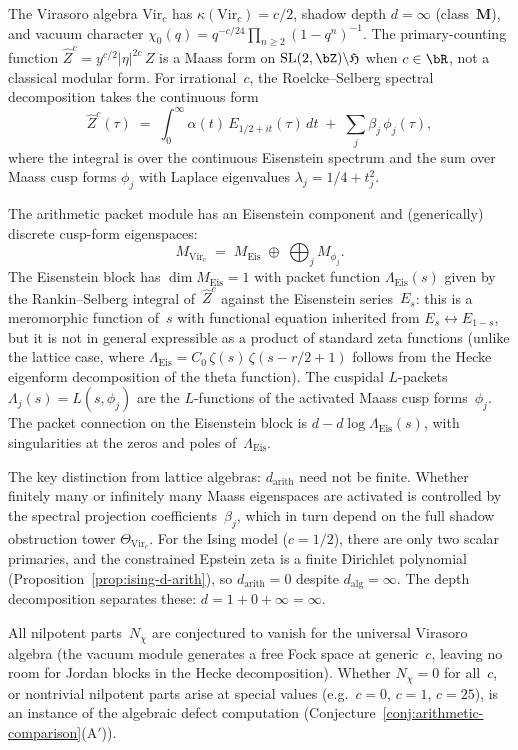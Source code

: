 \begin{example}%
\label{ex:packet-virasoro}%
%
%
The Virasoro algebra $\mathrm{Vir}_c$ has
$\kappa(\mathrm{Vir}_c) = c/2$, shadow depth $d = \infty$
(class~$\mathbf{M}$), and vacuum character
$\chi_0(q) = q^{-c/24}\prod_{n \geq 2}(1-q^n)^{-1}$.
The primary-counting function
$\widehat{Z}^c = y^{c/2}\lvert\eta\rvert^{2c}\,Z$
is a Maass form on $\mathrm{SL}(2,\bZ)\backslash\mathfrak{H}$
when $c \in \bR$, not a classical modular form.
For irrational~$c$, the Roelcke--Selberg spectral
decomposition takes the continuous form
\[
 \widehat{Z}^c(\tau)
 \;=\;
 \int_0^\infty \alpha(t)\,E_{1/2+it}(\tau)\,dt
 \;+\;
 \sum_j \beta_j\,\phi_j(\tau),
\]
where the integral is over the continuous Eisenstein spectrum
and the sum over Maass cusp forms $\phi_j$ with Laplace
eigenvalues $\lambda_j = 1/4 + t_j^2$.

The arithmetic packet module has an Eisenstein
component and (generically) discrete cusp-form eigenspaces:
\[
 M_{\mathrm{Vir}_c}
 \;=\;
 M_{\mathrm{Eis}} \;\oplus\;
 \bigoplus_j M_{\phi_j}.
\]
The Eisenstein block has $\dim M_{\mathrm{Eis}} = 1$ with
packet function $\Lambda_{\mathrm{Eis}}(s)$ given by the
Rankin--Selberg integral of~$\widehat{Z}^c$ against the
Eisenstein series~$E_s$: this is a meromorphic function
of~$s$ with functional equation inherited from
$E_s \leftrightarrow E_{1-s}$, but it is not in general
expressible as a product of standard zeta functions
(unlike the lattice case, where
$\Lambda_{\mathrm{Eis}} = C_0\,\zeta(s)\,\zeta(s{-}r/2{+}1)$
follows from the Hecke eigenform decomposition of the
theta function).
The cuspidal $L$-packets $\Lambda_j(s) = L(s,\phi_j)$ are the
$L$-functions of the activated Maass cusp forms~$\phi_j$.
The packet connection on the Eisenstein block is
$d - d\log\Lambda_{\mathrm{Eis}}(s)$,
with singularities at the zeros and poles
of~$\Lambda_{\mathrm{Eis}}$.

The key distinction from lattice algebras:
$d_{\mathrm{arith}}$ need not be finite. Whether finitely
many or infinitely many Maass eigenspaces are activated is
controlled by the spectral projection coefficients~$\beta_j$,
which in turn depend on the full shadow obstruction tower
$\Theta_{\mathrm{Vir}_c}$. For the Ising model ($c = 1/2$),
there are only two scalar primaries, and the constrained
Epstein zeta is a finite Dirichlet polynomial
(Proposition~\ref{prop:ising-d-arith}), so
$d_{\mathrm{arith}} = 0$ despite $d_{\mathrm{alg}} = \infty$.
The depth decomposition separates these:
$d = 1 + 0 + \infty = \infty$.

All nilpotent parts~$N_\chi$ are conjectured to vanish for
the universal Virasoro algebra (the vacuum module generates
a free Fock space at generic~$c$, leaving no room for Jordan
blocks in the Hecke decomposition). Whether $N_\chi = 0$
for all~$c$, or nontrivial nilpotent parts arise at special
values (e.g.\ $c = 0$, $c = 1$, $c = 25$),
is an instance of the algebraic defect computation
(Conjecture~\ref{conj:arithmetic-comparison}(A$'$)).
\end{example}

